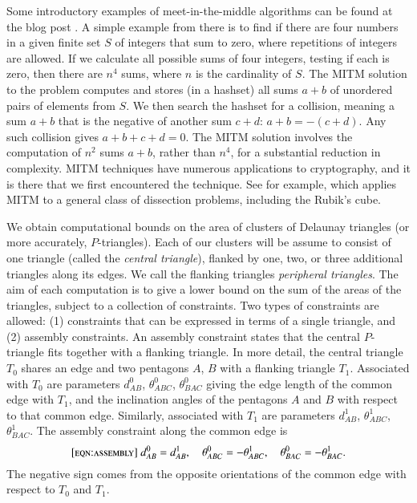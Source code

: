 Some introductory examples of meet-in-the-middle
algorithms can be found at the blog post \cite{mitm}.
A simple example from there is to find if there are four numbers in a
given finite set $S$ of integers that sum to zero, where repetitions
of integers are allowed.  If we calculate all possible sums of four
integers, testing if each is zero, then there are $n^4$ sums, where
$n$ is the cardinality of $S$.  The MITM solution to the problem
computes and stores (in a hashset) all sums $a+b$ of unordered pairs
of elements from $S$.  We then search the hashset for a collision,
meaning a sum $a+b$ that is the negative of another sum $c+d$: $a+b =
-(c+d)$.  Any such collision gives $a+b+c+d=0$.  The MITM solution
involves the computation of $n^2$ sums $a+b$, rather than $n^4$, for a
substantial reduction in complexity.  MITM techniques have numerous
applications to cryptography, and it is there that we first
encountered the technique.  See for example,
\cite{dinur2014dissection}
which applies MITM to a general class of dissection problems,
including the Rubik's cube.

We obtain computational bounds on the area of clusters of Delaunay
triangles (or more accurately, $P$-triangles).  Each of our clusters
will be assume to consist of one triangle (called the {\it central
triangle}), flanked by one, two, or three additional triangles along
its edges.  We call the flanking triangles {\it peripheral triangles}.
The aim of each computation is to give a lower bound on the sum of the
areas of the triangles, subject to a collection of constraints.  Two
types of constraints are allowed: (1) constraints that can be
expressed in terms of a single triangle, and (2) assembly constraints.
An assembly constraint states that the central $P$-triangle fits
together with a flanking triangle.  In more detail, the central
triangle $T_0$ shares an edge and two pentagons $A$, $B$ with a
flanking triangle $T_1$.  Associated with $T_0$ are parameters
$d^0_{AB}$, $\theta^0_{ABC}$, $\theta^0_{BAC}$ giving the edge length
of the common edge with $T_1$, and the inclination angles of the
pentagons $A$ and $B$ with respect to that common edge.  Similarly,
associated with $T_1$ are parameters $d^1_{AB}$, $\theta^1_{ABC}$,
$\theta^1_{BAC}$.  The assembly constraint along the common edge is
\begin{equation}\libel{eqn:assembly}
d^0_{AB} = d^1_{AB},\quad 
\theta^0_{ABC} = -\theta^1_{ABC},\quad \theta^0_{BAC} = -\theta^1_{BAC}.
\end{equation}
The negative sign comes from the opposite orientations of the common
edge with respect to $T_0$ and $T_1$.

